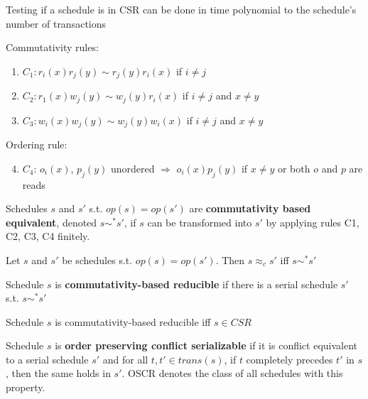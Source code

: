 \documentclass[11pt]{article}
\begin{document}
\begin{corollary}[]
Testing if a schedule is in CSR can be done in time polynomial to the schedule's number of transactions
\end{corollary}

Commutativity rules:
\begin{enumerate}
\item \(C_1:r_i(x)r_j(y)\sim r_j(y)r_i(x)\) if \(i\neq j\)
\item \(C_2:r_1(x)w_j(y)\sim w_j(y)r_i(x)\) if \(i\neq j\) and \(x\neq y\)
\item \(C_3:w_i(x)w_j(y)\sim w_j(y)w_i(x)\) if \(i\neq j\) and \(x\neq y\)
\end{enumerate}
Ordering rule:
\begin{enumerate}
\setcounter{enumi}{3}
\item \(C_4\): \(o_i(x)\), \(p_j(y)\) unordered \(\Rightarrow\) \(o_i(x)p_j(y)\)
if \(x\neq y\) or both \(o\) and \(p\) are reads
\end{enumerate}


\begin{definition}[]
Schedules \(s\) and \(s'\) s.t. \(op(s)=op(s')\) are \textbf{commutativity based equivalent},
denoted \(s\sim^*s'\), if \(s\) can be transformed into \(s'\) by applying rules C1, C2, C3, C4 finitely.
\end{definition}

\begin{theorem}[]
Let \(s\) and \(s'\)  be schedules s.t. \(op(s)=op(s')\). Then \(s\approx_cs'\) iff \(s\sim^*s'\)
\end{theorem}

\begin{definition}[]
Schedule \(s\) is \textbf{commutativity-based reducible} if there is a serial schedule \(s'\) s.t. \(s\sim^*s'\)
\end{definition}

\begin{corollary}[]
Schedule \(s\) is commutativity-based reducible iff \(s\in CSR\)
\end{corollary}

\begin{definition}[]
Schedule \(s\) is \textbf{order preserving conflict serializable} if it is conflict equivalent to a
serial schedule \(s'\) and for all \(t,t'\in trans(s)\), if \(t\) completely precedes \(t'\)
in \(s\), then the same holds in \(s'\). OSCR denotes the class of all schedules with this property.
\end{definition}
\end{document}
